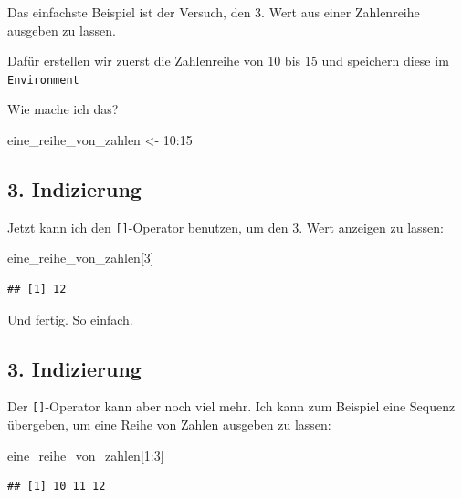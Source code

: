 \documentclass[
]{book}
\newenvironment{Shaded}{\begin{snugshade}}{\end{snugshade}}
\newcommand{\DecValTok}[1]{\textcolor[rgb]{0.00,0.00,0.81}{#1}}
\newcommand{\NormalTok}[1]{#1}
\newcommand{\OtherTok}[1]{\textcolor[rgb]{0.56,0.35,0.01}{#1}}
\newcommand{\SpecialCharTok}[1]{\textcolor[rgb]{0.00,0.00,0.00}{#1}}
\begin{document}
Das einfachste Beispiel ist der Versuch, den 3. Wert aus einer Zahlenreihe ausgeben zu lassen.

Dafür erstellen wir zuerst die Zahlenreihe von 10 bis 15 und speichern diese im \texttt{Environment}

Wie mache ich das?

\begin{Shaded}
\begin{Highlighting}[]
\NormalTok{eine\_reihe\_von\_zahlen }\OtherTok{\textless{}{-}} \DecValTok{10}\SpecialCharTok{:}\DecValTok{15}
\end{Highlighting}
\end{Shaded}

\hypertarget{indizierung-2}{%
\subsection{3. Indizierung}\label{indizierung-2}}

Jetzt kann ich den \texttt{{[}{]}}-Operator benutzen, um den 3. Wert anzeigen zu lassen:

\begin{Shaded}
\begin{Highlighting}[]
\NormalTok{eine\_reihe\_von\_zahlen[}\DecValTok{3}\NormalTok{]}
\end{Highlighting}
\end{Shaded}

\begin{verbatim}
## [1] 12
\end{verbatim}

Und fertig. So einfach.

\hypertarget{indizierung-3}{%
\subsection{3. Indizierung}\label{indizierung-3}}

Der \texttt{{[}{]}}-Operator kann aber noch viel mehr. Ich kann zum Beispiel eine Sequenz übergeben, um eine Reihe von Zahlen ausgeben zu lassen:

\begin{Shaded}
\begin{Highlighting}[]
\NormalTok{eine\_reihe\_von\_zahlen[}\DecValTok{1}\SpecialCharTok{:}\DecValTok{3}\NormalTok{]}
\end{Highlighting}
\end{Shaded}

\begin{verbatim}
## [1] 10 11 12
\end{verbatim}
\end{document}
